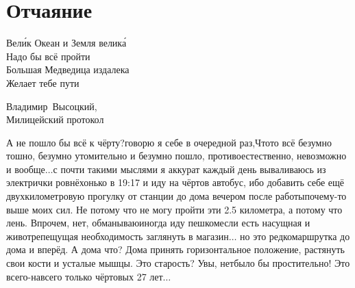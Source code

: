 \chapter{Отчаяние} 
\vepsianrose

\setlength{\epigraphwidth}{0.75\textwidth}

\epigraph{%
	Вел\'{и}к Океан и Земля велик\'{а} \\
	Надо бы всё пройти \\
	Большая Медведица издалека \\
	Желает тебе пути}
	{
	\begin{flushright}
		\small{Владимир~Высоцкий,\\Милицейский протокол}
	\end{flushright}
	}


\diagdash А не пошло бы всё к чёрту?\mdash говорю я себе в очередной раз,\mdash Что\sdash то всё безумно тошно, безумно утомительно и безумно пошло, противоестественно, невозможно и вообще$\ldots$\mdash с почти такими мыслями я аккурат каждый день вываливаюсь из электрички ровнёхонько в 19:17 и иду на чёртов автобус, ибо добавить себе ещё двухкилометровую прогулку от станции до дома вечером после работы\mdash почему-то выше моих сил.
Не потому что не могу пройти эти 2.5 километра, а потому что лень. Впрочем, нет, обманываю\mdash иногда иду пешком\mdash если есть насущная и животрепещущая необходимость заглянуть в магазин$\ldots$ но это редко\mdash маршрутка до дома и вперёд. %
А дома что? Дома принять горизонтальное положение, растянуть свои кости и усталые мышцы. Это старость? Увы, нет\mdash было бы простительно! Это всего-навсего только чёртовых 27 лет$\ldots$

